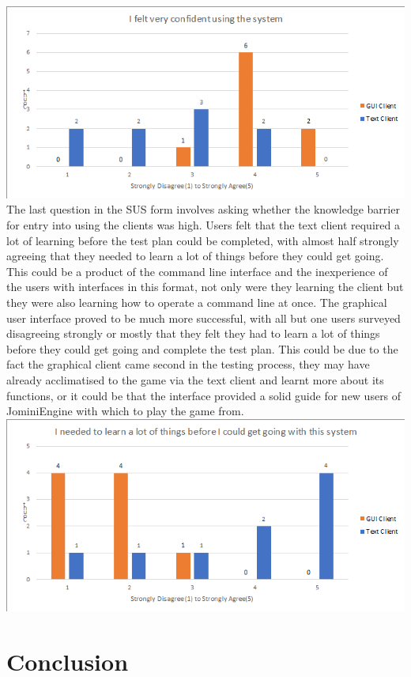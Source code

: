 \documentclass{article}
\begin{document}
\\
\includegraphics[width=\textwidth]{graph9.PNG}
The last question in the SUS form involves asking whether the knowledge barrier for entry into using the clients was high. Users felt that the text client required a lot of learning before the test plan could be completed, with almost half strongly agreeing that they needed to learn a lot of things before they could get going. This could be a product of the command line interface and the inexperience of the users with interfaces in this format, not only were they learning the client but they were also learning how to operate a command line at once. The graphical user interface proved to be much more successful, with all but one users surveyed disagreeing strongly or mostly that they felt they had to learn a lot of things before they could get going and complete the test plan. This could be due to the fact the graphical client came second in the testing process, they may have already acclimatised to the game via the text client and learnt more about its functions, or it could be that the interface provided a solid guide for new users of JominiEngine with which to play the game from.
\\
\includegraphics[width=\textwidth]{graph10.PNG}
\section{Conclusion}
\end{document}
